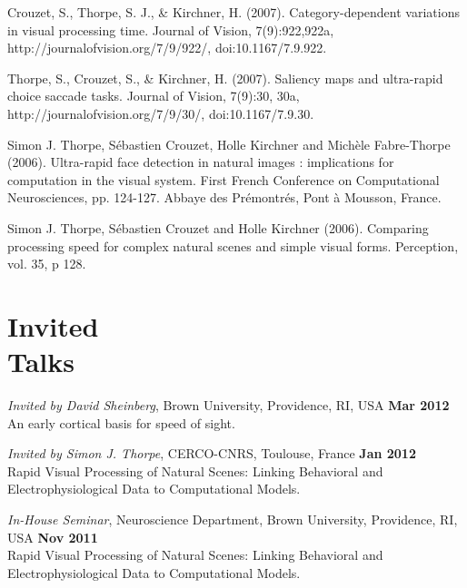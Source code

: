 \documentclass[margin,line]{resume}
\begin{document}
\begin{resume}
\vspace{-2mm} Crouzet, S., Thorpe, S. J., \& Kirchner, H. (2007). Category-dependent variations in visual processing time. Journal of Vision, 7(9):922,922a, http://journalofvision.org/7/9/922/, doi:10.1167/7.9.922.

\newpage

\vspace{-2mm} Thorpe, S., Crouzet, S., \& Kirchner, H. (2007). Saliency maps and ultra-rapid choice saccade tasks. Journal of Vision, 7(9):30, 30a, http://journalofvision.org/7/9/30/, doi:10.1167/7.9.30.

\vspace{-2mm} Simon J. Thorpe, Sébastien Crouzet, Holle Kirchner and Michèle Fabre-Thorpe (2006). Ultra-rapid face detection in natural images : implications for computation in the visual system. First French Conference on Computational Neurosciences, pp. 124-127. Abbaye des Prémontrés, Pont à Mousson, France.

\vspace{-2mm} Simon J. Thorpe, Sébastien Crouzet and Holle Kirchner (2006). Comparing processing speed for complex natural scenes and simple visual forms. Perception, vol. 35, p 128.

\normalsize


    \section{\mysidestyle Invited\\Talks}
    
\footnotesize %

\textit{Invited by David Sheinberg}, Brown University, Providence, RI, USA \hfill \textbf{Mar 2012}\\
An early cortical basis for speed of sight. 

\vspace{-2mm} 
\textit{Invited by Simon J. Thorpe}, CERCO-CNRS, Toulouse, France \hfill \textbf{Jan 2012}\\
Rapid Visual Processing of Natural Scenes: Linking Behavioral and Electrophysiological Data to Computational Models.

\vspace{-2mm} 
\textit{In-House Seminar}, Neuroscience Department, Brown University, Providence, RI, USA \hfill \textbf{Nov 2011}\\
Rapid Visual Processing of Natural Scenes: Linking Behavioral and Electrophysiological Data to Computational Models.


\end{resume}
\end{document}
